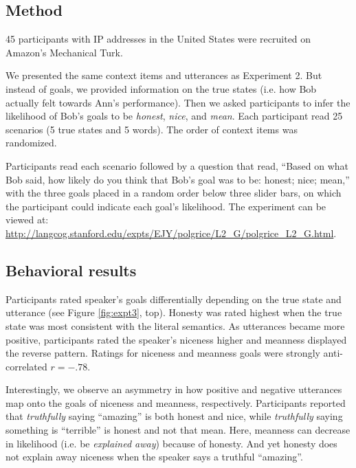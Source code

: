 \documentclass[10pt,letterpaper]{article}
\begin{document}
\subsection{Method}

45 participants with IP addresses in the United States were recruited on Amazon's Mechanical Turk.


We presented the same context items and utterances as Experiment 2.
But instead of goals, we provided information on the true states (i.e. how Bob actually felt towards Ann's performance).
Then we asked participants to infer the likelihood of Bob's goals to be \emph{honest}, \emph{nice}, and \emph{mean}.
Each participant read 25 scenarios (5 true states and 5 words).
The order of context items was randomized.

Participants read each scenario followed by a question that read, ``Based on what Bob said, how likely do you think that Bob's goal was to be: honest; nice; mean,'' with the three goals placed in a random order below three slider bars, on which the participant could indicate each goal's likelihood. 
The experiment can be viewed at: \url{http://langcog.stanford.edu/expts/EJY/polgrice/L2_G/polgrice_L2_G.html}.



\subsection{Behavioral results}

Participants rated speaker's goals differentially depending on the true state and utterance (see Figure \ref{fig:expt3}, top).
Honesty was rated highest when the true state was most consistent with the literal semantics. 
As utterances became more positive, participants rated the speaker's niceness higher and meanness displayed the reverse pattern. 
Ratings for niceness and meanness goals were strongly anti-correlated $r = -.78$.

Interestingly, we observe an asymmetry in how positive and negative utterances map onto the goals of niceness and meanness, respectively. 
Participants reported that \emph{truthfully} saying ``amazing'' is both honest and nice, while \emph{truthfully} saying something is ``terrible'' is honest and not that mean.
Here, meanness can decrease in likelihood (i.e. be \emph{explained away}) because of honesty.
And yet honesty does not explain away niceness when the speaker says a truthful ``amazing''. 
\end{document}
